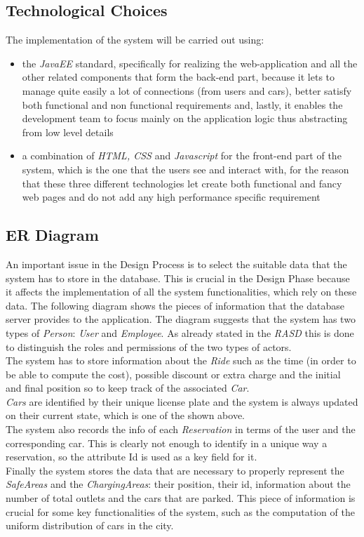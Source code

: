 \documentclass[11pt,a4paper]{report}
\begin{document}
\subsection{Technological Choices}
The implementation of the system will be carried out using: 
\begin{itemize}
	\item the \textit{JavaEE} standard, specifically for realizing the web-application and all the other related components that form the back-end part, because it lets to manage quite easily a lot of connections (from users and cars), better satisfy both functional and non functional requirements and, lastly,  it enables the development team to focus mainly on the application logic thus abstracting from low level details
	\item a combination of \textit{HTML, CSS} and \textit{Javascript} for the front-end part of the system, which is the one that the users see and interact with, for the reason that these three different technologies let create both functional and fancy web pages and do not add any high performance specific requirement 
\end{itemize}
\subsection{ER Diagram}
An important issue in the Design Process is to select the suitable data that the system has to store in the database. This is crucial in the Design Phase because it affects the implementation of all the system functionalities, which rely on these data. The following diagram shows the pieces of information that the database server provides to the application.
\noindent The diagram suggests that the system has two types of \textit{Person}: \textit{User} and \textit{Employee}. As already stated in the \textit{RASD} this is done to distinguish the roles and permissions of the two types of actors.\\
The system has to store information about the \textit{Ride} such as the time (in order to be able to compute the cost), possible discount or extra charge and the initial and final position so to keep track of the associated \textit{Car}.\\\textit{Cars} are identified by their unique license plate and the system is always updated on their current state, which is one of the shown above.\\The system also records the info of each \textit{Reservation} in terms of the user and the corresponding car. This is clearly not enough to identify in a unique way a reservation, so the attribute Id is used as a key field for it.\\
Finally the system stores the data that are necessary to properly represent the \textit{SafeAreas} and the \textit{ChargingAreas}: their position, their id, information about the number of total outlets and the cars that are parked. This piece of information is crucial for some key functionalities of the system, such as the computation of the uniform distribution of cars in the city.
\end{document}
